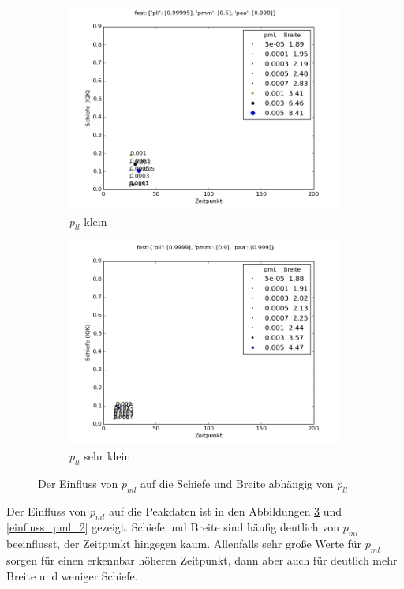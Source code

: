 \begin{figure}
\begin{subfigure}[b]{0.5\textwidth}
\includegraphics[width=\textwidth]{bilder/pml/pml_05_p_0998_099995}
\caption{$p_{ll}$ klein}
\label{einfluss_pml_pll-}
\end{subfigure}
\begin{subfigure}[b]{0.5\textwidth}
\includegraphics[width=\textwidth]{bilder/pml/pml_09_p_0999_09999}
\caption{$p_{ll}$ sehr klein}
\label{einfluss_pml_pll--}
\end{subfigure}
\caption{Der Einfluss von $p_{ml}$ auf die Schiefe und Breite abhängig von $p_{ll}$}
\label{einfluss_pml_1}
\end{figure}

Der Einfluss von $p_{ml}$ auf die Peakdaten ist in den Abbildungen \ref{einfluss_pml_1} und \ref{einfluss_pml_2} gezeigt. Schiefe und Breite sind häufig deutlich von $p_{ml}$ beeinflusst, der Zeitpunkt hingegen kaum. Allenfalls sehr große Werte für $p_{ml}$ sorgen für einen erkennbar höheren Zeitpunkt, dann aber auch für deutlich mehr Breite und weniger Schiefe.

